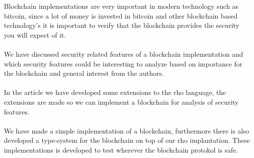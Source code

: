 Blockchain implementations are very important in modern technology such as bitcoin, since a lot of money is invested in bitcoin and other blockchain based technology's it is important to verify that the blockchain provides the security you will expect of it.\\
\\
We have discussed security related features of a blockchain implementation and which security features could be interesting to analyze based on importance for the blockchain and general interest from the authors.\\
\\
In the article we have developed some extensions to the rho language, the extensions are made so we can implement a blockchain for analysis of security features.\\
\\
We have made a simple implementation of a blockchain, furthermore there is also developed a type-system for the blockchain on top of our rho implantation. These implementations is developed to test wherever the blockchain protokol is safe.
